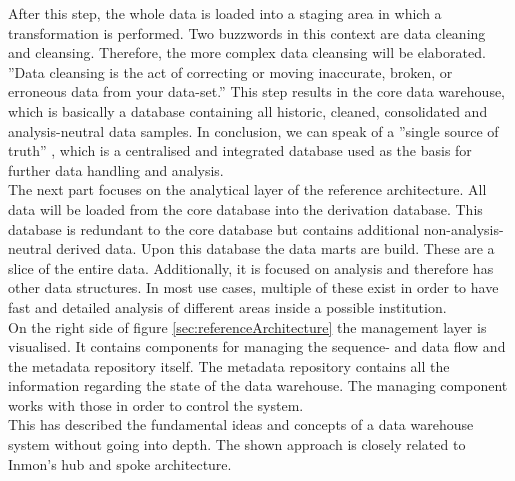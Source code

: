 After this step, the whole data is loaded into a staging area in which a transformation is performed. Two buzzwords in this context are data cleaning and cleansing. Therefore, the more complex data cleansing will be elaborated.
''Data cleansing is the act of correcting or moving inaccurate, broken, or erroneous data from your data-set.'' \cite{dataCleansing}
This step results in the core data warehouse, which is basically a database containing all historic, cleaned, consolidated and analysis-neutral data samples. In conclusion, we can speak of a ''single source of truth'' \cite{scriptRasch}, which is a centralised and integrated database used as the basis for further data handling and analysis.\newline
\\
The next part focuses on the analytical layer of the reference architecture. All data will be loaded from the core database into the derivation database. This database is redundant to the core database but contains additional non-analysis-neutral derived data. Upon this database the data marts are build. These are a slice of the entire data. Additionally, it is focused on analysis and therefore has other data structures. In most use cases, multiple of these exist in order to have fast and detailed analysis of different areas inside a possible institution.\newline
\\
On the right side of figure \ref{sec:referenceArchitecture} the management layer is visualised. It contains components for managing the sequence- and data flow and the metadata repository itself. \newline
The metadata repository contains all the information regarding the state of the data warehouse. The managing component works with those in order to control the system.
\newline
\\
This has described the fundamental ideas and concepts of a data warehouse system without going into depth. The shown approach is closely related to Inmon's hub and spoke architecture. 
